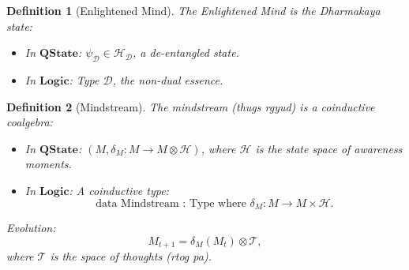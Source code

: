 \documentclass{article}
\newtheorem{definition}{Definition}[section]
\begin{document}
\begin{definition}[Enlightened Mind]
The Enlightened Mind is the Dharmakaya state:
\begin{itemize}
    \item In \(\mathbf{QState}\): \(\psi_{\mathcal{D}} \in \mathcal{H}_{\mathcal{D}}\), a de-entangled state.
    \item In \(\mathbf{Logic}\): Type \(\mathcal{D}\), the non-dual essence.
\end{itemize}
\end{definition}

\begin{definition}[Mindstream]
The mindstream (\textit{thugs rgyud}) is a coinductive coalgebra:
\begin{itemize}
    \item In \(\mathbf{QState}\): \((M, \delta_M: M \to M \otimes \mathcal{H})\), where \(\mathcal{H}\) is the state space of awareness moments.
    \item In \(\mathbf{Logic}\): A coinductive type:
    \[
    \text{data Mindstream : Type where } \delta_M : M \to M \times \mathcal{H}.
    \]
\end{itemize}
Evolution:
\[
M_{t+1} = \delta_M(M_t) \otimes \mathcal{T},
\]
where \(\mathcal{T}\) is the space of thoughts (\textit{rtog pa}).
\end{definition}
\end{document}

